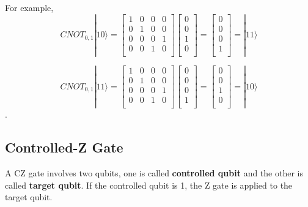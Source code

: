 For example,
\begin{equation}
CNOT_{0,1}|10\rangle = 
\begin{bmatrix}
1 & 0 & 0 & 0 \\
0 & 1 & 0 & 0 \\
0 & 0 & 0 & 1 \\
0 & 0 & 1 & 0 \\
\end{bmatrix}
 \left[
\begin{array}{c}
0 \\
0 \\
1 \\
0 \\
\end{array}
\right]
=  \left[
\begin{array}{c}
0 \\
0 \\
0 \\
1 \\
\end{array}
\right] 
= |11\rangle 
\end{equation}

\begin{equation}
CNOT_{0,1}|11\rangle = 
\begin{bmatrix}
1 & 0 & 0 & 0 \\
0 & 1 & 0 & 0 \\
0 & 0 & 0 & 1 \\
0 & 0 & 1 & 0 \\
\end{bmatrix}
 \left[
\begin{array}{c}
0 \\
0 \\
0 \\
1 \\
\end{array}
\right]
=  \left[
\begin{array}{c}
0 \\
0 \\
1 \\
0 \\
\end{array}
\right] 
= |10\rangle 
\end{equation}.

\subsection{Controlled-Z Gate}
A CZ gate involves two qubits, one is called \textbf{controlled qubit} and the other is called \textbf{target qubit}.  If the controlled qubit is 1, the Z gate is applied to the target qubit.

